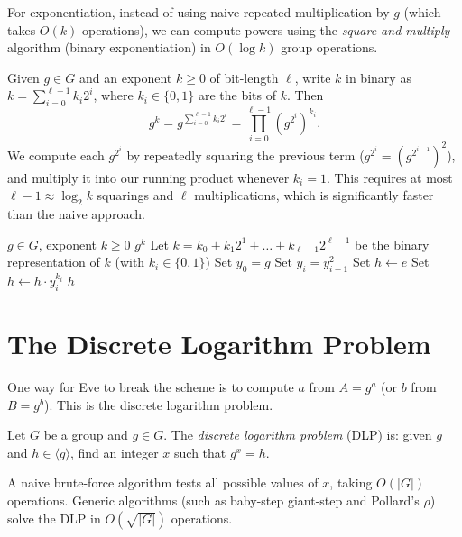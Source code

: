 For exponentiation, instead of using naive repeated multiplication by \(g\) (which takes \(O(k)\) operations), we can compute powers using the \emph{square-and-multiply} algorithm (binary exponentiation) in \(O(\log k)\) group operations.

Given \(g \in G\) and an exponent \(k \geq 0\) of bit-length \(\ell\),
write \(k\) in binary as \( k = \sum_{i=0}^{\ell-1} k_i 2^i\), where \(k_i \in \{0, 1\}\) are the bits of \(k\).
Then
\[
    \textstyle
    g^k = g^{\sum_{i=0}^{\ell-1} k_i 2^i} = \prod_{i=0}^{\ell-1} (g^{2^i})^{k_i}.
\]
We compute each \(g^{2^i}\) by repeatedly squaring the previous term (\(g^{2^i} = (g^{2^{i-1}})^2\)), and multiply it into our running product whenever \(k_i = 1\).
This requires at most \(\ell - 1 \approx \log_2 k\) squarings and \(\ell\) multiplications, which is significantly faster than the naive approach.

\begin{algorithm}[H]
    \begin{algorithmic}[1]
        \Require \(g \in G\), exponent \(k \geq 0\)
        \Ensure \(g^k\)
        \State Let \(k = k_0 + k_1 2^1 + \dots + k_{\ell-1} 2^{\ell-1}\) be the binary representation of \(k\) (with \(k_i \in \{0, 1\}\))
        \State Set \(y_0 = g\)
            \State Set \(y_i = y_{i-1}^2\)
        \EndFor
        \State Set \(h \leftarrow e\) 
            \State Set \(h \leftarrow h \cdot y_i^{k_i}\)
        \EndFor
        \State \Return \(h\)
    \end{algorithmic}
    \caption{Square-and-Multiply}
\end{algorithm}

\section*{The Discrete Logarithm Problem}

One way for Eve to break the scheme is to compute \(a\) from \(A = g^a\) (or \(b\) from \(B = g^b\)).
This is the discrete logarithm problem.

\begin{definition}
    Let \(G\) be a group and \(g \in G\).
    The \emph{discrete logarithm problem} (DLP) is:
    given \(g\) and \(h \in \langle g \rangle\), find an integer \(x\) such that \(g^x = h\).
\end{definition}

A naive brute-force algorithm tests all possible values of \(x\), taking \(O(|G|)\) operations.
Generic algorithms (such as baby-step giant-step and Pollard's \(\rho\)) solve the DLP in \(O(\sqrt{|G|})\) operations.

